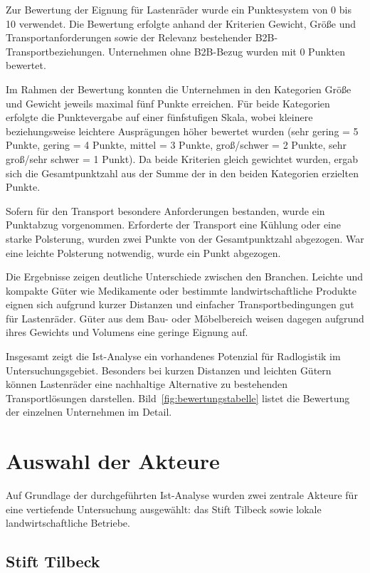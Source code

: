 \documentclass[a4paper,11pt,parskip=half,numbers=noenddot]{scrreprt}
\begin{document}
Zur Bewertung der Eignung für Lastenräder wurde ein Punktesystem von 0 bis 10 verwendet. Die Bewertung erfolgte anhand der Kriterien Gewicht, Größe und Transportanforderungen sowie der Relevanz bestehender B2B-Transportbeziehungen. Unternehmen ohne B2B-Bezug wurden mit 0 Punkten bewertet.

Im Rahmen der Bewertung konnten die Unternehmen in den Kategorien Größe und Gewicht jeweils maximal fünf Punkte erreichen. Für beide Kategorien erfolgte die Punktevergabe auf einer fünfstufigen Skala, wobei kleinere beziehungsweise leichtere Ausprägungen höher bewertet wurden (sehr gering = 5 Punkte, gering = 4 Punkte, mittel = 3 Punkte, groß/schwer = 2 Punkte, sehr groß/sehr schwer = 1 Punkt). Da beide Kriterien gleich gewichtet wurden, ergab sich die Gesamtpunktzahl aus der Summe der in den beiden Kategorien erzielten Punkte.

Sofern für den Transport besondere Anforderungen bestanden, wurde ein Punktabzug vorgenommen. Erforderte der Transport eine Kühlung oder eine starke Polsterung, wurden zwei Punkte von der Gesamtpunktzahl abgezogen. War eine leichte Polsterung notwendig, wurde ein Punkt abgezogen.

Die Ergebnisse zeigen deutliche Unterschiede zwischen den Branchen. Leichte und kompakte Güter wie Medikamente oder bestimmte landwirtschaftliche Produkte eignen sich aufgrund kurzer Distanzen und einfacher Transportbedingungen gut für Lastenräder. Güter aus dem Bau- oder Möbelbereich weisen dagegen aufgrund ihres Gewichts und Volumens eine geringe Eignung auf.

Insgesamt zeigt die Ist-Analyse ein vorhandenes Potenzial für Radlogistik im Untersuchungsgebiet. Besonders bei kurzen Distanzen und leichten Gütern können Lastenräder eine nachhaltige Alternative zu bestehenden Transportlösungen darstellen. Bild~\ref{fig:bewertungstabelle} listet die Bewertung der einzelnen Unternehmen im Detail.

\chapter{Auswahl der Akteure}
\label{ch:auswahl}

Auf Grundlage der durchgeführten Ist-Analyse wurden zwei zentrale Akteure für eine vertiefende Untersuchung ausgewählt: das Stift Tilbeck sowie lokale landwirtschaftliche Betriebe.

\section{Stift Tilbeck}
\end{document}

